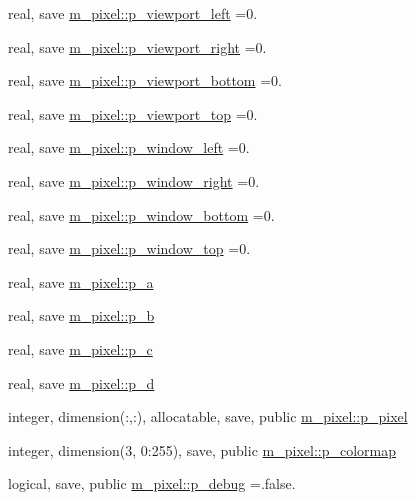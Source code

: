 \begin{DoxyCompactItemize}
\item 
real, save \mbox{\hyperlink{namespacem__pixel_aa5806ca65801efd8c0e6753be81847d6}{m\+\_\+pixel\+::p\+\_\+viewport\+\_\+left}} =0.
\item 
real, save \mbox{\hyperlink{namespacem__pixel_a85587aae427d1f08e1f835dc6756b121}{m\+\_\+pixel\+::p\+\_\+viewport\+\_\+right}} =0.
\item 
real, save \mbox{\hyperlink{namespacem__pixel_a1bcd9c34bcf4869912b4267964b5e92d}{m\+\_\+pixel\+::p\+\_\+viewport\+\_\+bottom}} =0.
\item 
real, save \mbox{\hyperlink{namespacem__pixel_a127bd1570b649951e9f064c65e71945c}{m\+\_\+pixel\+::p\+\_\+viewport\+\_\+top}} =0.
\item 
real, save \mbox{\hyperlink{namespacem__pixel_a03d347205feb2f06305a014717de8b26}{m\+\_\+pixel\+::p\+\_\+window\+\_\+left}} =0.
\item 
real, save \mbox{\hyperlink{namespacem__pixel_a213461921eae5a7ec6d2eb399cf849da}{m\+\_\+pixel\+::p\+\_\+window\+\_\+right}} =0.
\item 
real, save \mbox{\hyperlink{namespacem__pixel_a5956f9820f460143df9022d9eb7f833d}{m\+\_\+pixel\+::p\+\_\+window\+\_\+bottom}} =0.
\item 
real, save \mbox{\hyperlink{namespacem__pixel_ab8c6c7f81ee857e70e77b08de015d416}{m\+\_\+pixel\+::p\+\_\+window\+\_\+top}} =0.
\item 
real, save \mbox{\hyperlink{namespacem__pixel_a67dc9122cf985392ef839d0e01bdd175}{m\+\_\+pixel\+::p\+\_\+a}}
\item 
real, save \mbox{\hyperlink{namespacem__pixel_a54a88e65093f2eebae449b44eb9188ed}{m\+\_\+pixel\+::p\+\_\+b}}
\item 
real, save \mbox{\hyperlink{namespacem__pixel_a4f7e47e7c8108aea8b5e41bc4cde3cf4}{m\+\_\+pixel\+::p\+\_\+c}}
\item 
real, save \mbox{\hyperlink{namespacem__pixel_aedcfb264a04a70d3dba9dc7c347bdf37}{m\+\_\+pixel\+::p\+\_\+d}}
\item 
integer, dimension(\+:,\+:), allocatable, save, public \mbox{\hyperlink{namespacem__pixel_abdde5773f7569de72bb28d6818a44914}{m\+\_\+pixel\+::p\+\_\+pixel}}
\item 
integer, dimension(3, 0\+:255), save, public \mbox{\hyperlink{namespacem__pixel_aa6b9c445365db696d6a7a9a794ceba43}{m\+\_\+pixel\+::p\+\_\+colormap}}
\item 
logical, save, public \mbox{\hyperlink{namespacem__pixel_aa98d89b6e06aa65bb897ee27901ab8ce}{m\+\_\+pixel\+::p\+\_\+debug}} =.false.

\end{DoxyCompactItemize}
